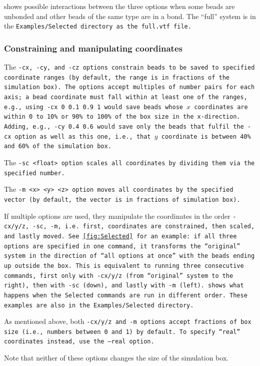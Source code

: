  shows possible interactions between the three
options when some beads are unbonded and other beads of the same type are in a
bond. The \enquote{full} system is in the \tt{Examples/Selected} directory as
the \tt{full.vtf} file.

\subsubsection{Constraining and manipulating coordinates}

The \tt{-cx}, \tt{-cy}, and \tt{-cz} options constrain beads to be saved to
specified coordinate ranges (by default, the range is in fractions of the
simulation box). The options accept multiples of number pairs for each axis; a
bead coordinate must fall within at least one of the ranges, e.g., using \tt{-cx
0 0.1 0.9 1} would save beads whose $x$ coordinates are within 0 to 10\% or
90\% to 100\% of the box size in the x-direction. Adding, e.g., \tt{-cy 0.4
0.6} would save only the beads that fulfil the \tt{-cx} option as well as this
one, i.e., that $y$ coordinate is between 40\% and 60\% of the simulation box.

The \tt{-sc <float>} option scales all coordinates by dividing them via the
specified number.

The \tt{-m <x> <y> <z>} option moves all coordinates by the specified vector (by
default, the vector is in fractions of simulation box).

If multiple options are used, they manipulate the coordinates in the order
\tt{-cx/y/z}, \tt{-sc}, \tt{-m}, i.e. first, coordinates are constrained, then
scaled, and lastly moved. See \cref{fig:Selected} for an example: if all three
options are specified in one command, it transforms the \enquote{original}
system in the direction of \enquote{all options at once} with the beads ending
up outside the box. This is equivalent to running three consecutive commands,
first only with \tt{-cx/y/z} (from \enquote{original} system to the right), then
with \tt{-sc} (down), and lastly with \tt{-m} (left).  shows
what happens when the \tt{Selected} commands are run in different order. These
examples are also in the \tt{Examples/Selected} directory.

As mentioned above, both \tt{-cx/y/z} and \tt{-m} options accept fractions of
box size (i.e., numbers between 0 and 1) by default. To specify \enquote{real}
coordinates instead, use the \tt{--real} option.

Note that neither of these options changes the size of the simulation box.

